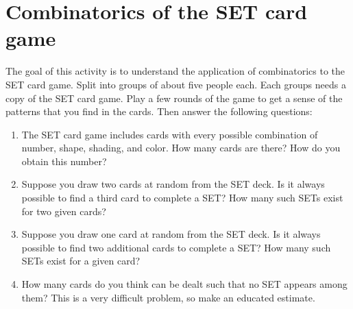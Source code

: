 \documentclass{book}
\theoremstyle{plain}
\theoremstyle{definition}
\newif\ifprintsolutions
\newcommand{\solution}[1]{\ifprintsolutions \begin{sloppypar}{\it #1}\end{sloppypar} \fi} %
\begin{document}
\section{Combinatorics of the SET card game}
The goal of this activity is to understand the application of combinatorics to the SET card game. Split into groups of about five people each. Each groups needs a copy of the SET card game. Play a few rounds of the game to get a sense of the patterns that you find in the cards. Then answer the following questions:
\begin{enumerate}
\item The SET card game includes cards with every possible combination of number, shape, shading, and color. How many cards are there? How do you obtain this number? \solution{There are $3^4=81$ cards.}
\item Suppose you draw two cards at random from the SET deck. Is it always possible to find a third card to complete a SET? How many such SETs exist for two given cards? \solution{There is exactly one card that completes the SET.}
\item Suppose you draw one card at random from the SET deck. Is it always possible to find two additional cards to complete a SET? How many such SETs exist for a given card? \solution{It is always possible. There are $80$ ways to draw a second card, and only one way to draw the final card. However, overcounting means there are $40$ such SETs.}
\item How many cards do you think can be dealt such that no SET appears among them? This is a very difficult problem, so make an educated estimate. \solution{It is possible to deal $20$ cards such that no SET is present.}
\end{enumerate}
\end{document}
